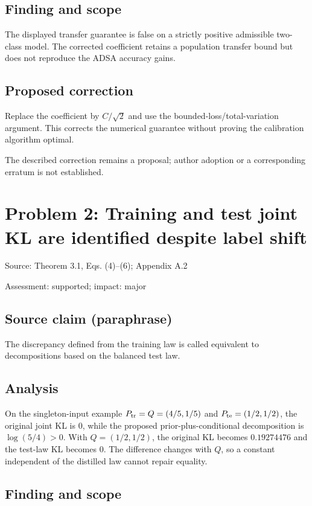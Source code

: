 \documentclass[11pt]{article}
\begin{document}
\subsection*{Finding and scope}

The displayed transfer guarantee is false on a strictly positive admissible two-class model. The corrected coefficient retains a population transfer bound but does not reproduce the ADSA accuracy gains.

\subsection*{Proposed correction}

Replace the coefficient by \(C/\sqrt2\) and use the bounded-loss/total-variation argument. This corrects the numerical guarantee without proving the calibration algorithm optimal.

The described correction remains a proposal; author adoption or a corresponding erratum is not established.

\section*{Problem 2: Training and test joint KL are identified despite label shift}

Source: Theorem 3.1, Eqs. (4)–(6); Appendix A.2

Assessment: supported; impact: major

\subsection*{Source claim (paraphrase)}

The discrepancy defined from the training law is called equivalent to decompositions based on the balanced test law.

\subsection*{Analysis}

On the singleton-input example \(P_{\rm tr}=Q=(4/5,1/5)\) and \(P_{\rm te}=(1/2,1/2)\), the original joint KL is \(0\), while the proposed prior-plus-conditional decomposition is \(\log(5/4)>0\). With \(Q=(1/2,1/2)\), the original KL becomes \(0.19274476\) and the test-law KL becomes \(0\). The difference changes with \(Q\), so a constant independent of the distilled law cannot repair equality.

\subsection*{Finding and scope}
\end{document}
